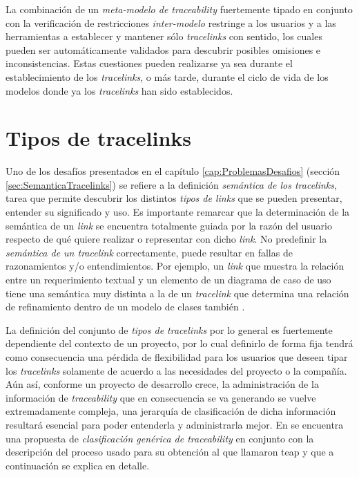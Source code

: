 \documentclass[a4paper,12pt,twoside,spanish,openright]{book}
\begin{document}
La combinación de un \textit{meta-modelo de traceability} fuertemente tipado en conjunto con la verificación de restricciones \textit{inter-modelo} restringe a los usuarios y a las herramientas a establecer y mantener sólo \textit{tracelinks} con sentido, los cuales pueden ser automáticamente validados para descubrir posibles omisiones e inconsistencias. Estas cuestiones pueden realizarse ya sea durante el establecimiento de los \textit{tracelinks}, o más tarde, durante el ciclo de vida de los modelos donde ya los \textit{tracelinks} han sido establecidos.




\section{Tipos de tracelinks}

Uno de los desafíos presentados en el capítulo \ref{cap:ProblemasDesafios} (sección \ref{sec:SemanticaTracelinks}) se refiere a la definición  \textit{semántica de los tracelinks}, tarea que permite descubrir los distintos \textit{tipos de links} que se pueden presentar, entender su significado y uso. Es importante remarcar que la determinación de la semántica de un \textit{link} se encuentra totalmente guiada por la razón del usuario respecto de qué quiere realizar o representar con dicho \textit{link}. No predefinir la \textit{semántica de un tracelink} correctamente, puede resultar en fallas de razonamientos y/o entendimientos. Por ejemplo, un \textit{link} que muestra la relación entre un requerimiento textual y un elemento de un diagrama de caso de uso  tiene una semántica muy distinta a la de un \textit{tracelink} que determina una relación de refinamiento dentro de un modelo de clases también .

La definición del conjunto de \textit{tipos de tracelinks} por lo general es fuertemente dependiente del contexto de un proyecto, por lo cual definirlo de forma fija tendrá como consecuencia una pérdida de flexibilidad para los usuarios que deseen tipar los \textit{tracelinks} solamente de acuerdo a las necesidades del proyecto o la compañía. Aún así, conforme un proyecto de desarrollo crece, la administración de la información de \textit{traceability} que en consecuencia se va generando se vuelve extremadamente compleja, una jerarquía de clasificación de dicha información resultará esencial para poder entenderla y administrarla mejor. En \cite{PaigeOlsenKolovosZschalerPower} se encuentra una propuesta de \textit{clasificación genérica de traceability} en conjunto con la descripción del proceso usado para su obtención al que llamaron \gls{teap} y que a continuación se explica en detalle.
\end{document}
